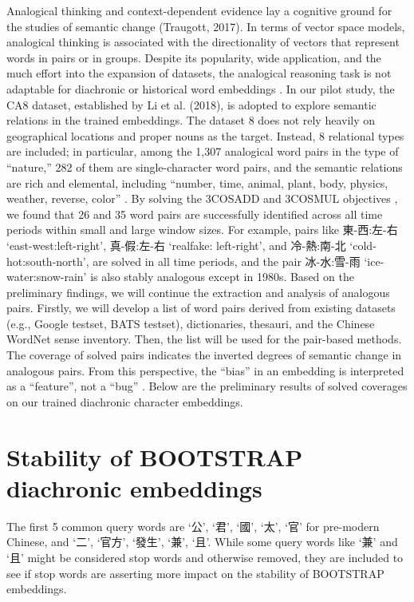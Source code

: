 Analogical thinking and context-dependent evidence lay a cognitive ground for the studies of semantic change \parencite{traugott2017semantic}(Traugott, 2017). In terms of vector space models, analogical thinking is associated with the directionality of vectors that represent words in pairs or in groups. Despite its popularity, wide application, and the much effort into the expansion of datasets, the analogical reasoning task is not adaptable for diachronic or historical word embeddings \parencite{wevers2020digital}. In our pilot study, the CA8 dataset, established by Li et al. (2018), is adopted to explore semantic relations in the trained embeddings. The dataset 8 does not rely heavily on geographical locations and proper nouns as the target. Instead, 8 relational types are included; in particular, among the 1,307 analogical word pairs in the type of “nature,” 282 of them are single-character word pairs, and the semantic relations are rich and elemental, including ``number, time, animal, plant, body, physics, weather, reverse, color'' \parencite{li2018analogical}. By solving the \textsc{3COSADD} and \textsc{3COSMUL} objectives \parencite{levy2014linguistic}, we found that 26 and 35 word pairs are successfully identified across all time periods within small and large window sizes. For example, pairs like 東-西:左-右 `east-west:left-right', 真-假:左-右 `realfake: left-right', and 冷-熱:南-北 `cold-hot:south-north', are solved in all time periods, and the pair 冰-水:雪-雨 `ice-water:snow-rain' is also stably analogous except in 1980s. Based on the preliminary findings, we will continue the extraction and analysis of analogous pairs. Firstly, we will develop a list of word pairs derived from existing datasets (e.g., Google testset, BATS testset), dictionaries, thesauri, and the Chinese WordNet sense inventory. Then, the list will be used for the pair-based methods. The coverage of solved pairs indicates the inverted degrees of semantic change in analogous pairs. From this perspective, the ``bias'' in an embedding is interpreted as a ``feature'', not a ``bug'' \parencite{wevers2020digital}. Below are the preliminary results of solved coverages on our trained diachronic character embeddings. 

\section{Stability of \textsc{BOOTSTRAP} diachronic embeddings}

The first 5 common query words are `公', `君', `國', `太', `官' for pre-modern Chinese, and `二', `官方', `發生', `兼', `且'. While some query words like `兼' and `且' might be considered stop words and otherwise removed, they are included to see if stop words are asserting more impact on the stability of \textsc{BOOTSTRAP} embeddings.

